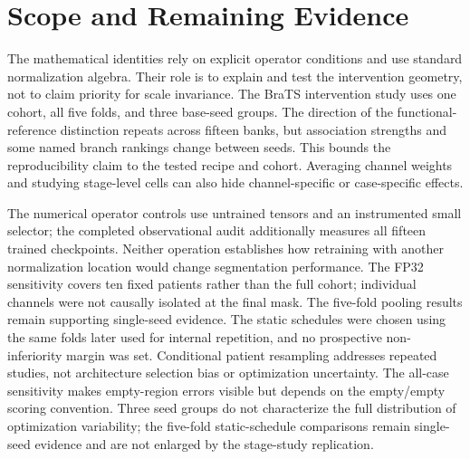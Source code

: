 \documentclass[mathematics,article,submit,pdftex,moreauthors]{Definitions/mdpi}
\begin{document}
\section{Scope and Remaining Evidence}
The mathematical identities rely on explicit operator conditions and use
standard normalization algebra. Their role is to explain and test the
intervention geometry, not to claim priority for scale invariance. The
BraTS intervention study uses one cohort, all five folds, and three
base-seed groups. The direction of the functional-reference distinction
repeats across fifteen banks, but association strengths and some named branch
rankings change between seeds. This bounds the reproducibility claim to
the tested recipe and cohort. Averaging channel weights and studying stage-level cells can
also hide channel-specific or case-specific effects.

The numerical operator controls use untrained tensors and an instrumented
small selector; the completed observational audit additionally measures all
fifteen trained checkpoints. Neither operation establishes how retraining
with another normalization location would change segmentation performance.
The FP32 sensitivity covers ten fixed patients rather than the full cohort;
individual channels were not causally isolated at the final mask.
The five-fold pooling results remain supporting single-seed evidence.
The static schedules were chosen using the same folds later used for
internal repetition, and no prospective non-inferiority margin was set.
Conditional patient resampling addresses repeated studies, not architecture
selection bias or optimization uncertainty. The all-case sensitivity makes
empty-region errors visible but depends on the empty/empty scoring convention.
Three seed groups do not characterize the full distribution of optimization
variability; the five-fold static-schedule comparisons remain single-seed
evidence and are not enlarged by the stage-study replication.
\end{document}
